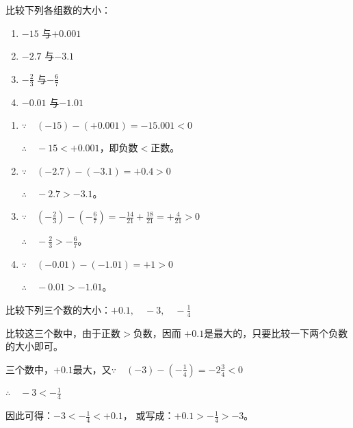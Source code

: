 \begin{example}
	比较下列各组数的大小：
	\begin{multicols}{2}
		\begin{enumerate}
			\item $-15$ 与$+0.001$
			\item $-2.7$ 与$-3.1$
			\item $-\frac{2}{3}$ 与$-\frac{6}{7}$
			\item $-0.01$ 与$-1.01$
		\end{enumerate}
	\end{multicols}
\end{example}

\begin{solution}
	\begin{enumerate}
		\item $\because\quad (-15)-(+0.001)=-15.001<0$
		
		$\therefore\quad -15<+0.001$，即负数$<$正数。
		
		\item $\because\quad (-2.7)-(-3.1)=+0.4>0$
		
		$\therefore\quad -2.7>-3.1$。
		
		\item $\because\quad \left(-\frac{2}{3}\right)-\left(-\frac{6}{7}\right)=-\frac{14}{21}+\frac{18}{21}=+\frac{4}{21}>0$
		
		$\therefore\quad -\frac{2}{3}>-\frac{6}{7}$。
		
		\item $\because\quad (-0.01)-(-1.01)=+1>0$
		
		$\therefore\quad -0.01>-1.01$。
	\end{enumerate}    
\end{solution}

\begin{example}
	比较下列三个数的大小：$+0.1,\quad -3,\quad -\frac{1}{4}$
\end{example}

\begin{analyze}
	比较这三个数中，由于正数$>$负数，因而
	$+0.1$是最大的，只要比较一下两个负数的大小即可。
\end{analyze}

\begin{solution}
	三个数中，$+0.1$最大，又$\because\quad (-3)-\left(-\frac{1}{4}\right)=-2\frac{3}{4}<0$
	
	$\therefore\quad -3<-\frac{1}{4}$
	
	因此可得：$-3<-\frac{1}{4}<+0.1$，
	或写成：$+0.1>-\frac{1}{4}>-3$。
\end{solution}

